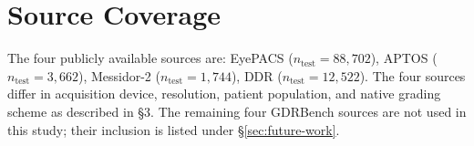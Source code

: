 \documentclass[11pt]{article}
\begin{document}
\section{Source Coverage}
The four publicly available sources are: EyePACS ($n_{\mathrm{test}} = 88{,}702$), APTOS ($n_{\mathrm{test}} = 3{,}662$), Messidor-2 ($n_{\mathrm{test}} = 1{,}744$), DDR ($n_{\mathrm{test}} = 12{,}522$). The four sources differ in acquisition device, resolution, patient population, and native grading scheme as described in §3. The remaining four GDRBench sources are not used in this study; their inclusion is listed under \S\ref{sec:future-work}.
\end{document}
